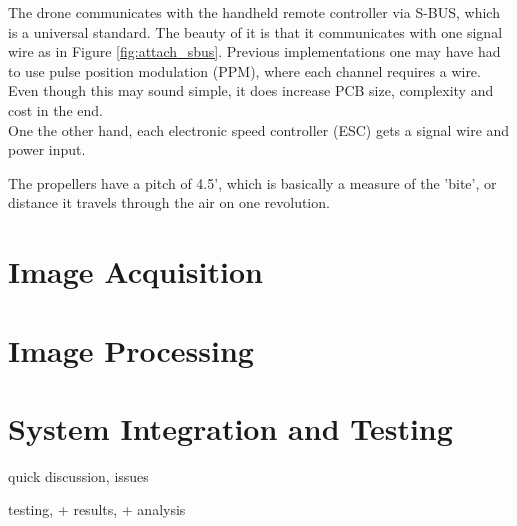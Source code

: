 The drone communicates with the handheld remote controller via S-BUS, which is a universal standard. The beauty of it is that it communicates with one signal wire as in Figure \ref{fig:attach_sbus}. Previous implementations one may have had to use pulse position modulation (PPM), where each channel requires a wire. Even though this may sound simple, it does increase PCB size, complexity and cost in the end.\\

\noindent
One the other hand, each electronic speed controller (ESC) gets a signal wire and power input.

\noindent
The propellers have a pitch of 4.5', which is basically a measure of the 'bite', or distance it travels through the air on one revolution.

\section{Image Acquisition}
\section{Image Processing}
\section{System Integration and Testing}

quick discussion, issues

testing, + results, + analysis










